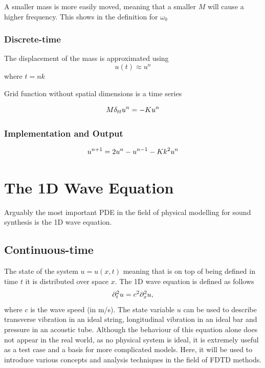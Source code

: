 A smaller mass is more easily moved, meaning that a smaller $M$ will cause a higher frequency. This shows in the definition for $\omega_0$

\subsubsection{Discrete-time}
The displacement of the mass is approximated using 
\begin{equation}
    u(t) \approx u^n
\end{equation}
where $t = nk$

Grid function without spatial dimensions is a time series

\begin{equation}
    M \delta_{tt} u^n = -Ku^n
\end{equation}
\subsubsection{Implementation and Output}
\begin{equation}
    u^{n+1} = 2u^n - u^{n-1} - Kk^2 u^n
\end{equation}



\section{%
The 1D Wave Equation}
Arguably the most important PDE in the field of physical modelling for sound synthesis is the 1D wave equation.
\subsection{Continuous-time}
The state of the system $u=u(x,t)$ meaning that is on top of being defined in time $t$ it is distributed over space $x$. The 1D wave equation is defined as follows
\begin{equation}\label{eq:1DwavePDE}
    \partial_t^2 u = c^2 \partial_x^2 u,
\end{equation}
where $c$ is the wave speed (in m/s). The state variable $u$ can be used to describe transverse vibration in an ideal string, longitudinal vibration in an ideal bar and pressure in an acoustic tube. Although the behaviour of this equation alone does not appear in the real world, as no physical system is ideal, it is extremely useful as a test case and a basis for more complicated models. Here, it will be used to introduce various concepts and analysis techniques in the field of FDTD methods.

